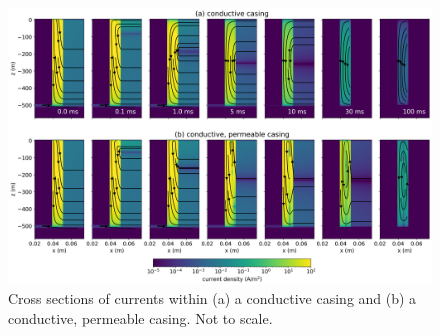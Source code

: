 \begin{figure}[H]
    \centering
    \includegraphics[width=\columnwidth]{figures/tdem-casing-currents.png}
\caption{Cross sections of currents within (a) a conductive casing and (b) a conductive, permeable casing. Not to scale.
}
\label{fig:tdem-casing-currents}
\end{figure}



